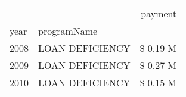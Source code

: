 \begin{tabular}{llr}
\toprule
 &  & payment \\
year & programName &  \\
\midrule
2008 & LOAN DEFICIENCY & \$ 0.19 M \\
\cline{1-3}
2009 & LOAN DEFICIENCY & \$ 0.27 M \\
\cline{1-3}
2010 & LOAN DEFICIENCY & \$ 0.15 M \\
\cline{1-3}
\bottomrule
\end{tabular}
